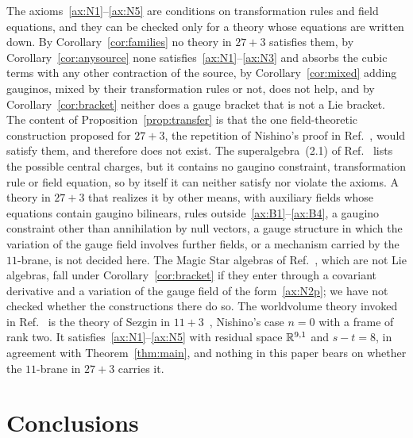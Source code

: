 \begin{remark}
\label{rem:applicability}
The axioms~\ref{ax:N1}--\ref{ax:N5} are conditions on transformation rules and field equations, and they can be checked only for a theory whose equations are written down. By Corollary~\ref{cor:families} no theory in $27+3$ satisfies them, by Corollary~\ref{cor:anysource} none satisfies~\ref{ax:N1}--\ref{ax:N3} and absorbs the cubic terms with any other contraction of the source, by Corollary~\ref{cor:mixed} adding gauginos, mixed by their transformation rules or not, does not help, and by Corollary~\ref{cor:bracket} neither does a gauge bracket that is not a Lie bracket. The content of Proposition~\ref{prop:transfer} is that the one field-theoretic construction proposed for $27+3$, the repetition of Nishino's proof in Ref.~\cite[Sec.~III.A]{RiosMarraniChester2019}, would satisfy them, and therefore does not exist. The superalgebra~(2.1) of Ref.~\cite{RiosMarraniChester2020} lists the possible central charges, but it contains no gaugino constraint, transformation rule or field equation, so by itself it can neither satisfy nor violate the axioms. A theory in $27+3$ that realizes it by other means, with auxiliary fields whose equations contain gaugino bilinears, rules outside~\ref{ax:B1}--\ref{ax:B4}, a gaugino constraint other than annihilation by null vectors, a gauge structure in which the variation of the gauge field involves further fields, or a mechanism carried by the $11$-brane, is not decided here. The Magic Star algebras of Ref.~\cite{TruiniMarraniRiosdeGraaf2025}, which are not Lie algebras, fall under Corollary~\ref{cor:bracket} if they enter through a covariant derivative and a variation of the gauge field of the form~\ref{ax:N2p}; we have not checked whether the constructions there do so. The worldvolume theory invoked in Ref.~\cite{RiosMarraniChester2020} is the theory of Sezgin in $11+3$~\cite{Sezgin1997}, Nishino's case $n=0$ with a frame of rank two. It satisfies~\ref{ax:N1}--\ref{ax:N5} with residual space $\mathbb{R}^{9,1}$ and $s-t=8$, in agreement with Theorem~\ref{thm:main}, and nothing in this paper bears on whether the $11$-brane in $27+3$ carries it.
\end{remark}

\section{Conclusions}
\label{sec:conclusions}

